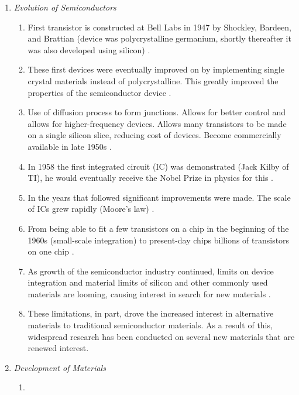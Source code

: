 \documentclass{article}
\begin{document}
\begin{enumerate}
\begin{enumerate}
		\item{\emph{Evolution of Semiconductors}}
		\begin{enumerate}%
			\item{First transistor is constructed at Bell Labs in 1947 by Shockley, Bardeen, and Brattian (device was polycrystalline germanium, shortly thereafter it was also developed using silicon) \cite{Neamen_Semiconductor_Physics2003}.}
			\item{These first devices were eventually improved on by implementing single crystal materials instead of polycrystalline. This greatly improved the properties of the semiconductor device \cite{Neamen_Semiconductor_Physics2003}.}
			\item{Use of diffusion process to form junctions. Allows for better control and allows for higher-frequency devices. Allows many transistors to be made on a single silicon slice, reducing cost of devices. Become commercially available in late 1950s \cite{Neamen_Semiconductor_Physics2003}.}
			\item{In 1958 the first integrated circuit (IC) was demonstrated (Jack Kilby of TI), he would eventually receive the Nobel Prize in physics for this \cite{Lukasiak_JorunTelcomm2010, Kilby_Patent1959}. }
			\item{In the years that followed significant improvements were made. The scale of ICs grew rapidly (Moore's law) \cite{Moore_Electronics1965}.}
			\item{From being able to fit a few transistors on a chip in the beginning of the 1960s (small-scale integration) to present-day chips billions of transistors on one chip \cite{Clarke_EEtimes2005}.}
			\item{As growth of the semiconductor industry continued, limits on device integration and material limits of silicon and other commonly used materials are looming, causing interest in search for new materials \cite{Meindl_Science2001, Schulz_Nature1999}. }
			\item{These limitations, in part, drove the increased interest in alternative materials to traditional semiconductor materials. As a result of this, widespread research has been conducted on several new materials that are renewed interest. }
		\end{enumerate}%
		
		\item{\emph{Development of \Td Materials}}
		\begin{enumerate}%
			\item{}
		\end{enumerate}%


\end{enumerate}
\end{enumerate}
\end{document}
